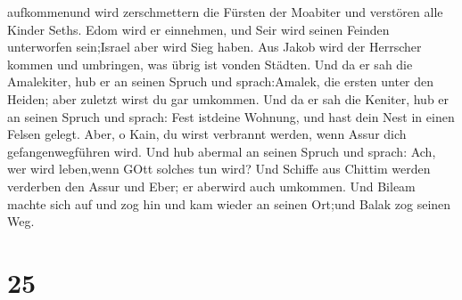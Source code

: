 aufkommenund wird zerschmettern die Fürsten der Moabiter und verstören
alle Kinder Seths.  Edom wird er einnehmen, und Seir wird
seinen Feinden unterworfen sein;Israel aber wird Sieg haben.
 Aus Jakob wird der Herrscher kommen und umbringen, was
übrig ist vonden Städten.  Und da er sah die Amalekiter,
hub er an seinen Spruch und sprach:Amalek, die ersten unter den Heiden;
aber zuletzt wirst du gar umkommen.  Und da er sah die
Keniter, hub er an seinen Spruch und sprach: Fest istdeine Wohnung, und
hast dein Nest in einen Felsen gelegt.  Aber, o Kain, du
wirst verbrannt werden, wenn Assur dich gefangenwegführen wird.
 Und hub abermal an seinen Spruch und sprach: Ach, wer wird
leben,wenn GOtt solches tun wird?  Und Schiffe aus Chittim
werden verderben den Assur und Eber; er aberwird auch umkommen.
 Und Bileam machte sich auf und zog hin und kam wieder an
seinen Ort;und Balak zog seinen Weg.

\hypertarget{section-24}{%
\section{25}\label{section-24}}

